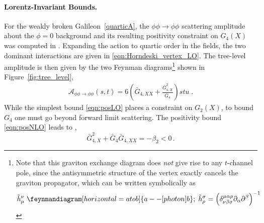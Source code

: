 \documentclass[11pt]{article}
\newcommand{\G}{  \bar{G} }
\begin{document}
\paragraph{Lorentz-Invariant Bounds.}
For the weakly broken Galileon~\eqref{quarticA}, the $\phi \phi \to \phi \phi$ scattering amplitude about the $\phi = 0$ background and its resulting positivity constraint on $G_4 (X)$ was computed in \cite{Melville:2019wyy}. 
Expanding the action to quartic order in the fields, the two dominant interactions are given in \eqref{eqn:Horndeski_vertex_LO}. 
The tree-level amplitude is then given by the two Feynman diagrams\footnote{
Note that this graviton exchange diagram does \emph{not} give rise to any $t$-channel pole, since the antisymmetric structure of the vertex exactly cancels the graviton propagator, which can be written symbolically as\begin{equation}
\tilde{h}_\mu^\nu
\; \feynmandiagram [horizontal=a to b] {
a -- [photon] b
}; \;
\tilde{h}_\rho^\sigma =  \left( \delta^{\mu \alpha \rho}_{\nu \beta \sigma} \partial_\alpha \partial^\beta \right)^{-1}
\end{equation}
} shown in Figure~\ref{fig:tree_level},
\begin{align}
 \mathcal{A}_{\phi \phi \to \phi \phi} (s,t) = 6 \left( \bar{G}_{4,XX} + \frac{\bar{G}_{4,X}^2}{\bar{G}_4}  \right) s t u \; . 
\end{align}
%
While the simplest bound \eqref{eqn:posLO} places a constraint on $G_2 (X)$, to bound $G_4$ one must go beyond forward limit scattering. The positivity bound \eqref{eqn:posNLO} leads to \cite{Melville:2019wyy},
\begin{equation}
 \G_{4,X}^2 +  \G_4 \G_{4,XX}  = -\beta_2 < 0 \, .
\end{equation}
\end{document}
